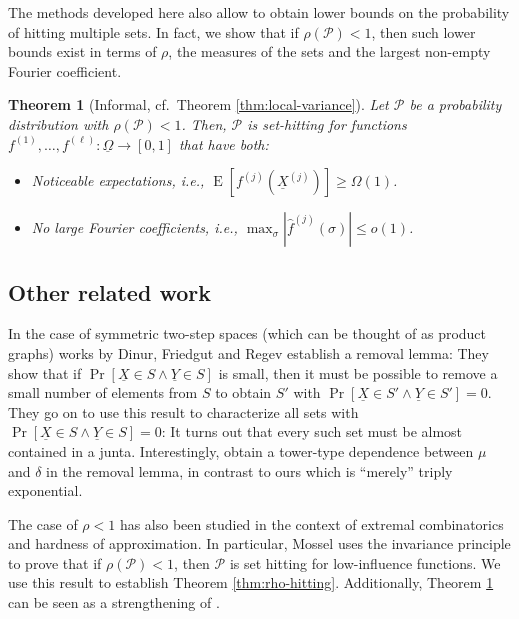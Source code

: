 \documentclass{daj}
\newcommand{\1}{\mathbbm{1}}
\theoremstyle{plain}
\newtheorem{theorem}{Theorem}[section]
\theoremstyle{definition}
\DeclareMathOperator*{\EE}{E}
\newcommand{\cP}{\mathcal{P}}
\begin{document}
The methods developed here also allow to obtain lower bounds on the 
probability of hitting multiple sets. In fact, we show that if $\rho(\cP) < 1$, 
then such lower bounds exist in terms of $\rho$, 
the measures of the sets and the largest non-empty Fourier coefficient. 

\begin{theorem}[Informal, cf.~Theorem \ref{thm:local-variance}]
\label{thm:local-variance-basic}
Let $\cP$ be a probability distribution with $\rho(\cP) < 1$. Then, $\cP$
is set-hitting for functions $f^{(1)}, \ldots, f^{(\ell)}: 
\underline{\Omega} \to [0, 1]$ that have both:
\begin{itemize}
  \item Noticeable expectations, i.e., 
$\EE[f^{(j)}(\underline{X}^{(j)})] \ge \Omega(1)$.
  \item No large Fourier coefficients, i.e.,
$\max_{\sigma} \left| \hat{f}^{(j)}(\sigma) \right| \le o(1)$.
\end{itemize}
\end{theorem}


\subsection{Other related work}

In the case of symmetric two-step spaces
(which can be thought of as product graphs) 
works by Dinur, Friedgut and Regev \cite{DFR08, FR18}
establish a removal lemma: They show
that if $\Pr[\underline{X} \in S \land \underline{Y} \in S]$ is small,
then it must be possible to remove a small number of elements from $S$
to obtain $S'$ with $\Pr[\underline{X} \in S' \land \underline{Y} \in S'] = 0$.
They go on to use this result to characterize all sets with
$\Pr[\underline{X} \in S \land \underline{Y} \in S] = 0$: It turns out
that every such set must be almost contained in a junta. 
Interestingly, \cite{FR18} obtain
a tower-type dependence between $\mu$ and $\delta$ in the removal lemma,
in contrast to ours which is ``merely'' triply exponential.

The case of $\rho < 1$ has also been studied in the context of extremal 
combinatorics and hardness of approximation.
In particular, Mossel \cite{Mos10} uses the 
invariance principle to prove that if $\rho(\mathcal{P}) < 1$, then $\mathcal{P}$ is
set hitting for low-influence functions. We use this result to establish
Theorem \ref{thm:rho-hitting}. Additionally, Theorem 
\ref{thm:local-variance-basic} can be seen as a strengthening of
\cite{Mos10}.
\end{document}
